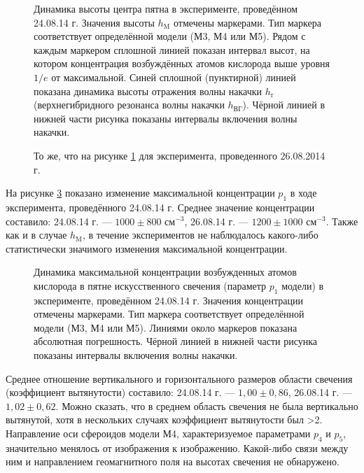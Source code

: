 \documentclass[12pt,a4paper]{article}
\begin{document}
\begin{figure}[h]
	\caption{Динамика высоты центра пятна в эксперименте, проведённом 24.08.14 г. Значения высоты $h_\text{M}$ отмечены маркерами. Тип маркера соответствует определённой модели (М3, М4 или М5). Рядом с каждым маркером сплошной линией показан интервал высот, на котором концентрация возбуждённых атомов кислорода выше уровня $1/e$ от максимальной. Синей сплошной (пунктирной) линией показана динамика высоты отражения волны накачки $h_\text{r}$ (верхнегибридного резонанса волны накачки $h_\text{ВГ}$). Чёрной линией в нижней части рисунка показаны интервалы включения волны накачки.}
	\label{fig:fig8_1}
\end{figure}	

\begin{figure}[h]
	\caption{То же, что на рисунке \ref{fig:fig8_1} для эксперимента, проведенного 26.08.2014 г.}
	\label{fig:fig8_2}
\end{figure}	

На рисунке \ref{fig:fig9_1} показано изменение максимальной концентрации $p_1$ в ходе эксперимента, проведённого 24.08.14 г. Среднее значение концентрации составило: 24.08.14 г. --- $1000\pm800$ см$^{-3}$, 26.08.14 г. --- $1200\pm1000$ см$^{-3}$. Также как и в случае $h_\text{M}$, в течение экспериментов не наблюдалось какого-либо статистически значимого изменения максимальной концентрации.

\begin{figure}[h]
	\caption{Динамика максимальной концентрации возбужденных атомов кислорода в пятне искусственного свечения (параметр $p_1$ модели) в эксперименте, проведённом 24.08.14 г. Значения концентрации отмечены маркерами. Тип маркера соответствует определённой модели (М3, М4 или М5). Линиями около маркеров показана абсолютная погрешность. Чёрной линией в нижней части рисунка показаны интервалы включения волны накачки.}
	\label{fig:fig9_1}
\end{figure}

Среднее отношение вертикального и горизонтального размеров области свечения (коэффициент вытянутости) составило: 24.08.14 г. --- $1,00\pm0,86$, 26.08.14 г. --- $1,02\pm0,62$. Можно сказать, что в среднем область свечения не была вертикально вытянутой, хотя в нескольких случаях коэффициент вытянутости был >2. Направление оси сфероидов модели М4, характеризуемое параметрами $p_4$ и $p_5$, значительно менялось от изображения к изображению. Какой-либо связи между ним и направлением геомагнитного поля на высотах свечения не обнаружено. 
\end{document}
